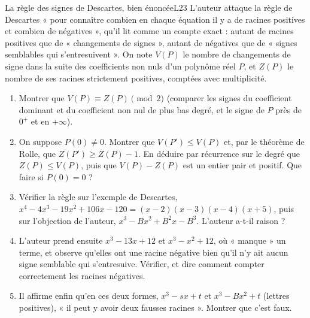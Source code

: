 \documentclass[11pt,a4paper]{article}
\begin{document}
\begin{exercice}{La règle des signes de Descartes, bien énoncée}{L2}{3}
L'auteur attaque la règle de Descartes « pour connaître combien en chaque équation
il y a de racines positives et combien de négatives », qu'il lit comme un compte
exact : autant de racines positives que de « changements de signes », autant de
négatives que de « signes semblables qui s'entresuivent ». On note $V(P)$ le nombre
de changements de signe dans la suite des coefficients non nuls d'un polynôme réel
$P$, et $Z(P)$ le nombre de ses racines strictement positives, comptées avec
multiplicité.
\begin{enumerate}
\item Montrer que $V(P) \equiv Z(P) \pmod 2$ (comparer les signes du coefficient
  dominant et du coefficient non nul de plus bas degré, et le signe de $P$ près de
  $0^+$ et en $+\infty$).
\item On suppose $P(0) \neq 0$. Montrer que $V(P') \le V(P)$ et, par le théorème de
  Rolle, que $Z(P') \ge Z(P) - 1$. En déduire par récurrence sur le degré que
  $Z(P) \le V(P)$, puis que $V(P) - Z(P)$ est un entier pair et positif. Que faire
  si $P(0) = 0$ ?
\item Vérifier la règle sur l'exemple de Descartes,
  $x^4 - 4x^3 - 19x^2 + 106x - 120 = (x-2)(x-3)(x-4)(x+5)$, puis sur l'objection
  de l'auteur, $x^3 - Bx^2 + B^2x - B^3$. L'auteur a-t-il raison ?
\item L'auteur prend ensuite $x^3 - 13x + 12$ et $x^3 - x^2 + 12$, où « manque » un
  terme, et observe qu'elles ont une racine négative bien qu'il n'y ait aucun signe
  semblable qui s'entresuive. Vérifier, et dire comment compter correctement les
  racines négatives.
\item Il affirme enfin qu'en ces deux formes, $x^3 - sx + t$ et $x^3 - Bx^2 + t$
  (lettres positives), « il peut y avoir deux fausses racines ». Montrer que c'est
  faux.
\end{enumerate}
\end{exercice}
\end{document}
